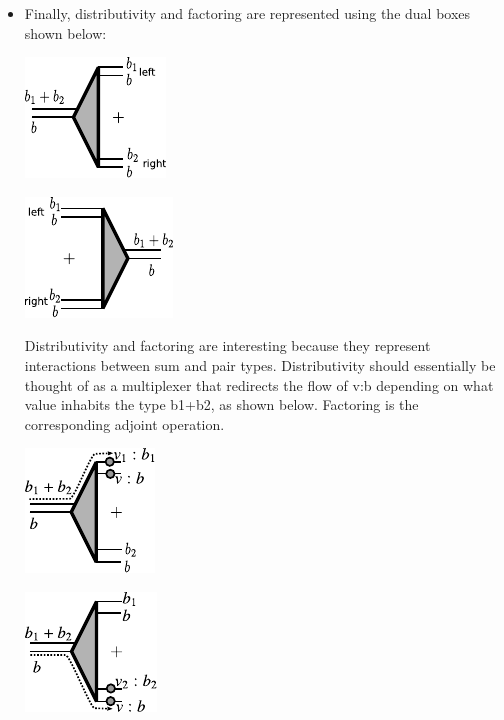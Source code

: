 \documentclass[preprint]{sigplanconf}
\begin{document}
\begin{itemize}
\item Finally, distributivity and factoring are represented using the dual
  boxes shown below:
\begin{multicols}{2}
\begin{center}
  \includegraphics{diagrams/thesis/dist.pdf}
\end{center}
\begin{center}
  \includegraphics{diagrams/thesis/factor.pdf}
\end{center}
\end{multicols}

Distributivity and factoring are interesting because they represent
interactions between sum and pair types. Distributivity should
essentially be thought of as a multiplexer that redirects the flow of
{{v:b}} depending on what value inhabits the type {{b1+b2}}, as shown
below. Factoring is the corresponding adjoint operation.

\begin{multicols}{2}
\begin{center}
  \includegraphics{diagrams/thesis/dist-wire-value1.pdf}
\end{center}
\begin{center}
  \includegraphics{diagrams/thesis/dist-wire-value2.pdf}
\end{center}
\end{multicols}


\end{itemize}
\end{document}

